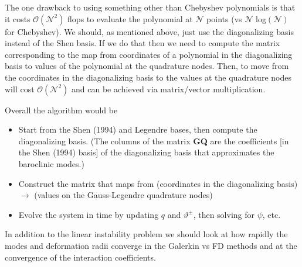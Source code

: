 \documentclass[10pt]{article}
\newcommand{\sN}{\mathcal{N}}
\begin{document}
The one drawback to using something other than Chebyshev polynomials is that it costs $\mathcal{O}(\sN^2)$ flops to evaluate the polynomial at $\sN$ points (vs $\sN$ log$(\sN)$ for Chebyshev).
We should, as mentioned above, just use the diagonalizing basis instead of the Shen basis.
If we do that then we need to compute the matrix corresponding to the map from coordinates of a polynomial in the diagonalizing basis to values of the polynomial at the quadrature nodes.
Then, to move from the coordinates in the diagonalizing basis to the values at the quadrature nodes will cost $\mathcal{O}(\sN^2)$ and can be achieved via matrix/vector multiplication.

Overall the algorithm would be 
\begin{itemize}
\item Start from the Shen (1994) and Legendre bases, then compute the diagonalizing basis. (The columns of the matrix {\bf GQ} are the coefficients [in the Shen (1994) basis] of the diagonalizing basis that approximates the baroclinic modes.)
\item Construct the matrix that maps from (coordinates in the diagonalizing basis) $\to $ (values on the Gauss-Legendre quadrature nodes)
\item Evolve the system in time by updating $q$ and $\vartheta^\pm$, then solving for $\psi$, etc.
\end{itemize}

In addition to the linear instability problem we should look at how rapidly the modes and deformation radii converge in the Galerkin vs FD methods and at the convergence of the interaction coefficients.\\
\end{document}
